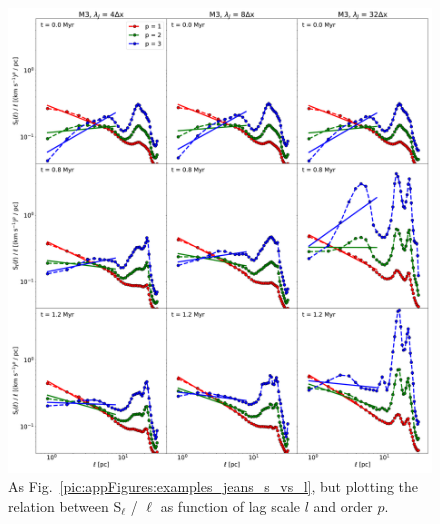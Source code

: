  	
\begin{figure}
    \centering
    \includegraphics[width=\textwidth]{app_examples_jeans_sl_l.pdf}
    \caption{
        As Fig.~\ref{pic:appFigures:examples_jeans_s_vs_l}, but plotting the relation between S$_{\ell}$ / $\ell$ as function of lag scale $l$ and order $p$.
    }
    \label{pic:appFigures:examples_jeans_sl_vs_l}
\end{figure}

